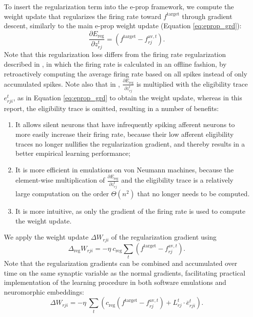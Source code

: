 		To insert the regularization term into the e-prop framework, we compute the weight update that regularizes the firing rate toward $f^\text{target}$ through gradient descent, similarly to the main e-prop weight update (Equation \ref{eq:eprop_grd}):
		\begin{equation}
		\frac{\partial E_\text{reg}}{\partial z_{rj}^t} = \left(f^\text{target} - f^{\text{av}, t}_{rj}\right).
		\end{equation}
		Note that this regularization loss differs from the firing rate regularization described in \citet{bellec2020solution}, in which the firing rate is calculated in an offline fashion, by retroactively computing the average firing rate based on all spikes instead of only accumulated spikes.
		Note also that in \citet{bellec2020solution}, $\frac{\partial E_\text{reg}}{\partial z_{rj}^t}$ is multiplied with the eligibility trace $e^t_{rji}$, as in Equation \ref{eq:eprop_grd} to obtain the weight update, whereas in this report, the eligibility trace is omitted, resulting in a number of benefits:
		\begin{enumerate}
			\item It allows silent neurons that have infrequently spiking afferent neurons to more easily increase their firing rate, because their low afferent eligibility traces no longer nullifies the regularization gradient, and thereby results in a better empirical learning performance;
			\item It is more efficient in emulations on von Neumann machines, because the element-wise multiplication of $\frac{\partial E_\text{reg}}{\partial z_{rj}^t}$ and the eligibility trace is a relatively large computation on the order $\Theta\!\left(n^2\right)$ that no longer needs to be computed.
			\item It is more intuitive, as only the gradient of the firing rate is used to compute the weight update.
		\end{enumerate}
		We apply the weight update $\Delta W_{rji}$ of the regularization gradient using
		\begin{equation}\label{eq:deltareg}
		\Delta_\text{reg} W_{rji} = -\eta\ c_\text{reg}\sum_t\left(f^\text{target} - f^{\text{av}, t}_{rj}\right).
		\end{equation}
		Note that the regularization gradients can be combined and accumulated over time on the same synaptic variable as the normal gradients, facilitating practical implementation of the learning procedure in both software emulations and neuromorphic embeddings:
		\begin{equation}
		\Delta W_{rji} = -\eta\ \sum_t\left(c_\text{reg}\left(f^\text{target} - f^{\text{av}, t}_{rj}\right) + L^t_{rj}\cdot\bar{e}^t_{rji}\right).
		\end{equation}

